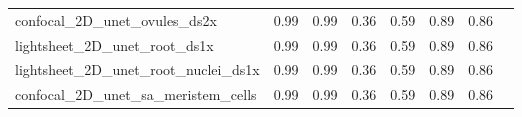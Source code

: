 \documentclass[./dissertation.tex]{subfiles}
\begin{document}
\begin{table}
\begin{tabular}{|l|c|c|c|c|c|c|c|}
        confocal\_2D\_unet\_ovules\_ds2x         & 0.99                                 & 0.99                                  & 0.36                                   & 0.59                                    & 0.89                                   & 0.86                                     \\
        lightsheet\_2D\_unet\_root\_ds1x         & 0.99                                 & 0.99                                  & 0.36                                   & 0.59                                    & 0.89                                   & 0.86                                     \\
        lightsheet\_2D\_unet\_root\_nuclei\_ds1x & 0.99                                 & 0.99                                  & 0.36                                   & 0.59                                    & 0.89                                   & 0.86                                     \\
        confocal\_2D\_unet\_sa\_meristem\_cells  & 0.99                                 & 0.99                                  & 0.36                                   & 0.59                                    & 0.89                                   & 0.86                                     \\
        \hline
    \end{tabular}
\end{table}
\end{document}
